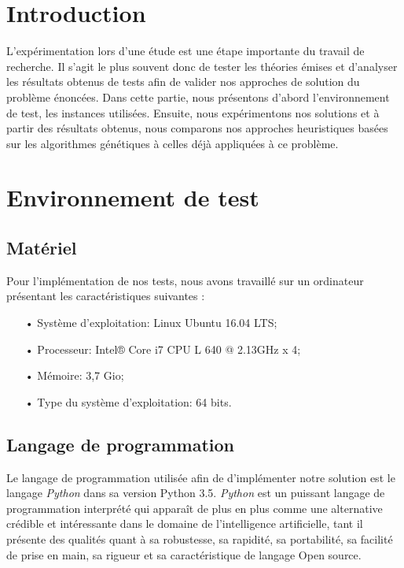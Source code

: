 \documentclass[12pt,a4paper]{article}
\begin{document}
		\section*{Introduction}
		L'expérimentation lors d'une étude est une étape importante du travail de recherche. Il s'agit le plus souvent donc de tester les théories émises et d'analyser les résultats obtenus de tests afin de valider nos approches de solution du problème énoncées. Dans cette partie, nous présentons d'abord l'environnement de test, les instances utilisées. Ensuite, nous expérimentons nos solutions et à partir des résultats obtenus, nous comparons nos approches heuristiques basées sur les algorithmes génétiques à celles déjà appliquées à ce problème.
		
		\section{Environnement de test} 
		
		\subsection{Matériel}
		Pour l'implémentation de nos tests, nous avons travaillé sur un ordinateur présentant les caractéristiques suivantes :\\
		\begin{itemize}
			\item[•] Système d'exploitation: Linux Ubuntu 16.04 LTS; \\
			\item[•] Processeur: Intel®  Core  i7 CPU L 640 @ 2.13GHz x 4; \\
			\item[•] Mémoire: 3,7 Gio;\\
			\item[•] Type du système d'exploitation: 64 bits.\\
		\end{itemize}
		\subsection{Langage de programmation}
		Le langage de programmation utilisée afin de d'implémenter notre solution est le langage \emph{Python} dans sa version Python 3.5. \emph{Python} est un puissant langage de programmation interprété qui apparaît de plus en plus comme une alternative crédible et intéressante dans le domaine de l'intelligence artificielle, tant il présente des qualités quant à sa robustesse, sa rapidité, sa portabilité, sa facilité de prise en main, sa rigueur et sa caractéristique de langage Open source.  
		
\end{document}
